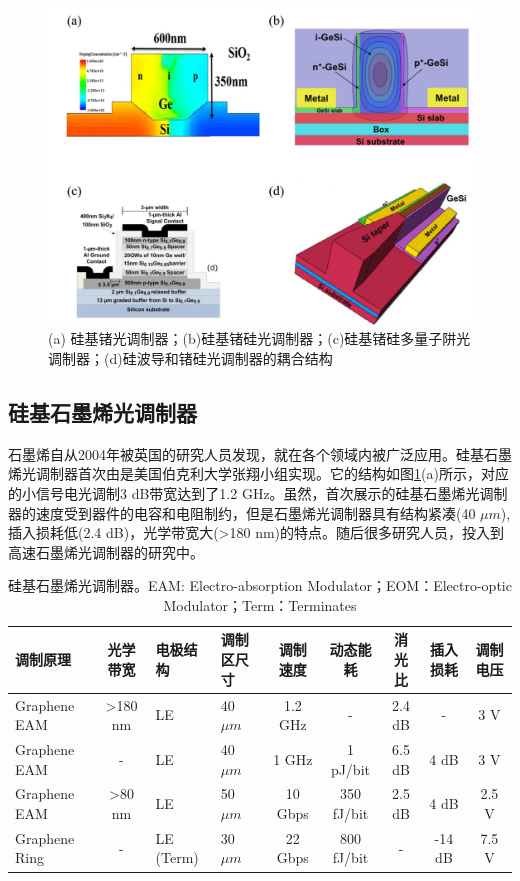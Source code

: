 \begin{figure}[htb]
	\centering
	\includegraphics[width=12cm]{./Pictures/fig_ge_mod.jpg}
	\caption{ (a) 硅基锗光调制器\cite{Srinivasan201656}；(b)硅基锗硅光调制器\cite{Dazeng2013high}；(c)硅基锗硅多量子阱光调制器\cite{chaisakul201223}；(d)硅波导和锗硅光调制器的耦合结构\cite{Dazeng2013high}}
	\label{fig_ge_mod}
\end{figure}
\subsection{硅基石墨烯光调制器}
石墨烯自从2004年被英国的研究人员发现\cite{novoselov2004electric}，就在各个领域内被广泛应用。硅基石墨烯光调制器首次由是美国伯克利大学张翔小组实现。它的结构如图\ref{sil_graphene_mod}(a)所示，对应的小信号电光调制3 dB带宽达到了1.2 GHz。虽然，首次展示的硅基石墨烯光调制器的速度受到器件的电容和电阻制约，但是石墨烯光调制器具有结构紧凑(40 $\mu m$),插入损耗低(2.4 dB)，光学带宽大(>180 nm)的特点。随后很多研究人员，投入到高速石墨烯光调制器的研究中。
{
	\begin{table}[htb]
		\caption{硅基石墨烯光调制器。EAM: Electro-absorption Modulator；EOM：Electro-optic Modulator；Term：Terminates}
		\label{sil_graphene_mod}
		\centering
		\begin{tabular}[t]{p{1.5cm}cp{0.8cm}p{1.2cm}ccccc}
			\hline
			调制原理 & 光学带宽 & 电极结构 & 调制区尺寸 & 调制速度 & 动态能耗 & 消光比 & 插入损耗 & 调制电压\\
			\hline
			Graphene EAM\cite{liu2011graphene} & >180 nm & LE  & 40 $\mu m$ & 1.2 GHz & - & 2.4 dB & - & 3 V\\
			Graphene EAM\cite{liu2012double} & -  & LE  & 40 $\mu m$ & 1 GHz & 1 pJ/bit & 6.5 dB & 4 dB & 3 V\\
			Graphene EAM\cite{hu2014broadband} & >80 nm & LE  & 50 $\mu m$ & 10 Gbps & 350 fJ/bit & 2.5 dB & 4 dB& 2.5 V\\
			Graphene Ring\cite{phare2015graphene} & - & LE (Term) & 30 $\mu m$ & 22 Gbps & 800 fJ/bit & - & -14 dB & 7.5 V\\
			\hline
		\end{tabular}
	\end{table}
}

